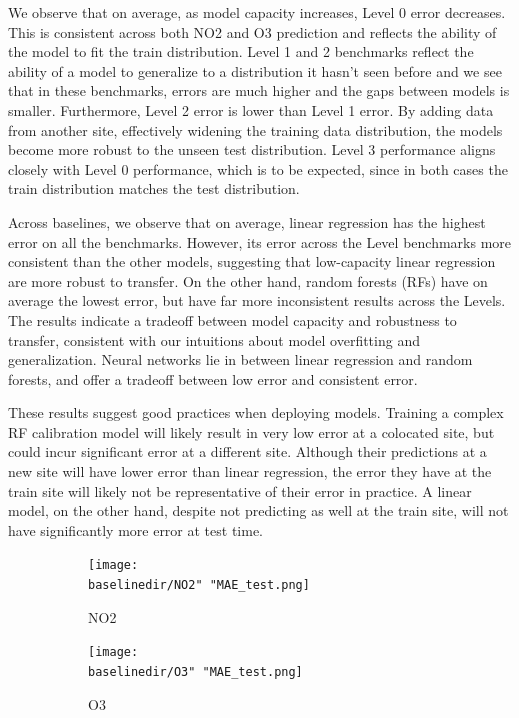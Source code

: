 \documentclass[journal abbreviation, manuscript]{copernicus}
\begin{document}
We observe that on average, as model capacity increases, Level 0 error decreases. This is consistent across both NO2 and O3 prediction and reflects the ability of the model to fit the train distribution. Level 1 and 2 benchmarks reflect the ability of a model to generalize to a distribution it hasn't seen before and we see that in these benchmarks, errors are much higher and the gaps between models is smaller.
Furthermore, Level 2 error is lower than Level 1 error. By adding data from another site, effectively widening the training data distribution, the models become more robust to the unseen test distribution. Level 3 performance aligns closely with Level 0 performance, which is to be expected, since in both cases
the train distribution matches the test distribution.

Across baselines, we observe that on average, linear regression has the highest error on all the benchmarks. However, its error across the Level benchmarks more consistent than the other models, suggesting that low-capacity linear regression are more robust to transfer. On the other hand, random forests (RFs) have on average the lowest error, but have far more inconsistent results across the Levels. The results indicate a tradeoff between model capacity and robustness to transfer, consistent with our intuitions about model overfitting and generalization. Neural networks lie in between linear regression and random forests, and offer a tradeoff between low error and consistent error. 

These results suggest good practices when deploying models. Training a complex RF calibration model will likely result in very low error at a colocated site, but could incur significant error at a different site. Although their predictions at a new site will have lower error than linear regression, the error they have at the train site will likely not be representative of their error in practice. A linear model, on the other hand, despite not predicting as well at the train site, will not have significantly more error at test time.

\begin{figure}[H]
\centering
\begin{subfigure}{0.45\textwidth}
\texttt{[image: \\baselinedir/NO2" "MAE\_test.png]}
\caption{NO2}
\end{subfigure}
\begin{subfigure}{0.45\textwidth}
\texttt{[image: \\baselinedir/O3" "MAE\_test.png]}
\caption{O3}
\end{subfigure}
\caption{}
\label{fig:results-linear}
\end{figure}
\end{document}
